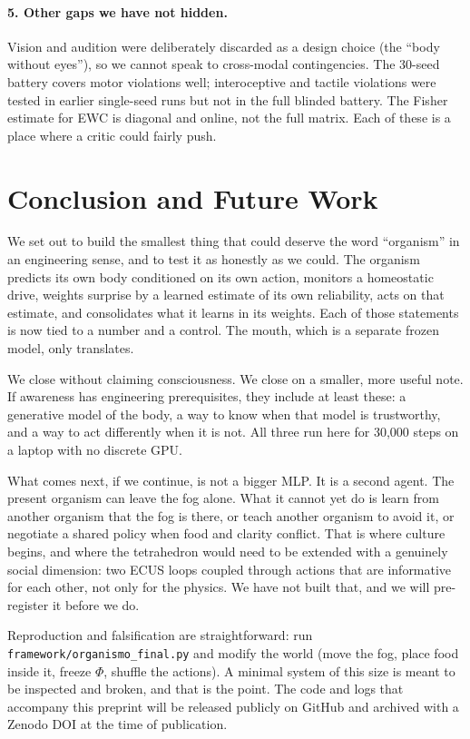 \documentclass[11pt,a4paper]{article}
\begin{document}
\paragraph{5. Other gaps we have not hidden.} Vision and audition were deliberately discarded as a design choice (the ``body without eyes''), so we cannot speak to cross-modal contingencies. The 30-seed battery covers motor violations well; interoceptive and tactile violations were tested in earlier single-seed runs but not in the full blinded battery. The Fisher estimate for EWC is diagonal and online, not the full matrix. Each of these is a place where a critic could fairly push.

\section{Conclusion and Future Work}

We set out to build the smallest thing that could deserve the word ``organism'' in an engineering sense, and to test it as honestly as we could. The organism predicts its own body conditioned on its own action, monitors a homeostatic drive, weights surprise by a learned estimate of its own reliability, acts on that estimate, and consolidates what it learns in its weights. Each of those statements is now tied to a number and a control. The mouth, which is a separate frozen model, only translates.

We close without claiming consciousness. We close on a smaller, more useful note. If awareness has engineering prerequisites, they include at least these: a generative model of the body, a way to know when that model is trustworthy, and a way to act differently when it is not. All three run here for 30,000 steps on a laptop with no discrete GPU.

What comes next, if we continue, is not a bigger MLP. It is a second agent. The present organism can leave the fog alone. What it cannot yet do is learn from another organism that the fog is there, or teach another organism to avoid it, or negotiate a shared policy when food and clarity conflict. That is where culture begins, and where the tetrahedron would need to be extended with a genuinely social dimension: two ECUS loops coupled through actions that are informative for each other, not only for the physics. We have not built that, and we will pre-register it before we do.

Reproduction and falsification are straightforward: run \texttt{framework/organismo\_final.py} and modify the world (move the fog, place food inside it, freeze $\Phi$, shuffle the actions). A minimal system of this size is meant to be inspected and broken, and that is the point. The code and logs that accompany this preprint will be released publicly on GitHub and archived with a Zenodo DOI at the time of publication.
\end{document}
